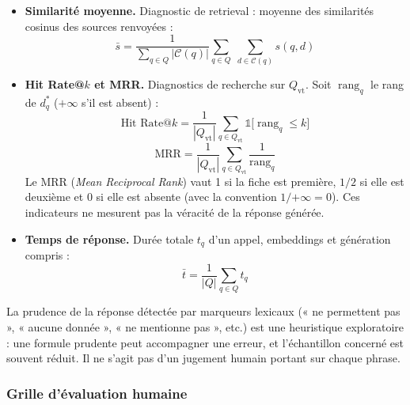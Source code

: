 \begin{itemize}
    \item \textbf{Similarité moyenne.} Diagnostic de retrieval : moyenne des
    similarités cosinus des sources renvoyées :
    \begin{equation}
        \bar{s} =
        \frac{1}{\sum_{q \in Q} |\mathcal{C}(q)|}
        \sum_{q \in Q} \; \sum_{d \in \mathcal{C}(q)} s(q, d)
        \label{eq:sim_moy}
    \end{equation}

    \item \textbf{Hit Rate@$k$ et MRR.} Diagnostics de recherche sur
    $Q_{\text{vt}}$. Soit $\operatorname{rang}_q$ le rang de $d^{*}_q$
    ($+\infty$ s'il est absent) :
    \begin{equation}
        \text{Hit Rate@$k$} =
        \frac{1}{|Q_{\text{vt}}|}
        \sum_{q \in Q_{\text{vt}}}
        \mathbb{1}\big[\operatorname{rang}_q \le k\big]
        \label{eq:hitrate}
    \end{equation}
    \begin{equation}
        \text{MRR} =
        \frac{1}{|Q_{\text{vt}}|}
        \sum_{q \in Q_{\text{vt}}}
        \frac{1}{\operatorname{rang}_q}
        \label{eq:mrr}
    \end{equation}
    Le MRR (\textit{Mean Reciprocal Rank}) vaut 1 si la fiche est première,
    $1/2$ si elle est deuxième et 0 si elle est absente
    (avec la convention $1/{+\infty} = 0$). Ces indicateurs ne mesurent pas
    la véracité de la réponse générée.

    \item \textbf{Temps de réponse.} Durée totale $t_q$ d'un appel, embeddings
    et génération compris :
    \begin{equation}
        \bar{t} = \frac{1}{|Q|} \sum_{q \in Q} t_q
        \label{eq:temps}
    \end{equation}
\end{itemize}

La prudence de la réponse détectée par marqueurs lexicaux (« ne permettent pas »,
« aucune donnée », « ne mentionne pas », etc.) est une heuristique exploratoire :
une formule prudente peut accompagner une erreur, et l'échantillon concerné est
souvent réduit. Il ne s'agit pas d'un jugement humain portant sur chaque phrase.

\subsubsection{Grille d'évaluation humaine}

